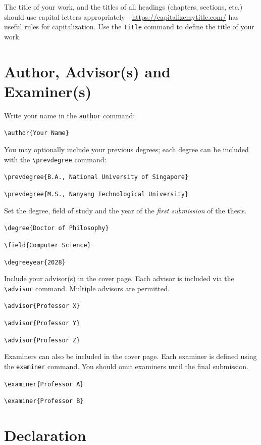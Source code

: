The title of your work, and the titles of all headings (chapters,
sections, etc.) should use capital letters appropriately---\url{https://capitalizemytitle.com/}
has useful rules for capitalization. Use the \texttt{title} command to define the title of
your work. 

\section{Author, Advisor(s) and Examiner(s)}

Write your name in the \texttt{author} command:

\texttt{\textbackslash author\{Your Name\}}

You may optionally include your previous degrees; each degree can be included with the \texttt{\textbackslash prevdegree} command:

\texttt{\textbackslash prevdegree\{B.A., National University of Singapore\}}

\texttt{\textbackslash prevdegree\{M.S., Nanyang Technological University\}}

Set the degree, field of study and the year of the \emph{first submission} of the thesis.

\texttt{\textbackslash degree\{Doctor of Philosophy\}}

\texttt{\textbackslash field\{Computer Science\}}

\texttt{\textbackslash degreeyear\{2028\}}

Include your advisor(s) in the cover page. Each advisor is included
via the \texttt{\textbackslash advisor} command. Multiple advisors
are permitted.

\texttt{\textbackslash advisor\{Professor X\}}

\texttt{\textbackslash advisor\{Professor Y\}}

\texttt{\textbackslash advisor\{Professor Z\}}

Examiners can also be included in the cover page. Each examiner
is defined using the \texttt{examiner}
command. You should omit examiners until the final submission.

\texttt{\textbackslash examiner\{Professor A\}}

\texttt{\textbackslash examiner\{Professor B\}}


\section{Declaration}

